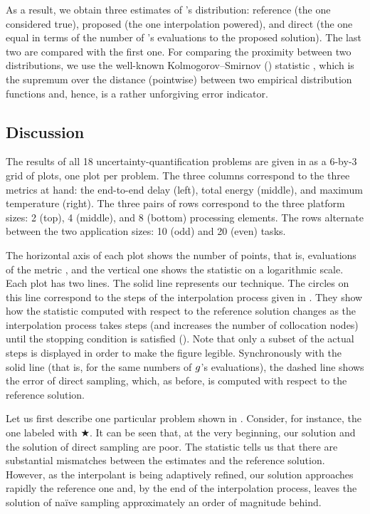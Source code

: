 As a result, we obtain three estimates of \g's distribution: reference (the one
considered true), proposed (the one interpolation powered), and direct (the one
equal in terms of the number of \g's evaluations to the proposed solution). The
last two are compared with the first one. For comparing the proximity between
two distributions, we use the well-known Kolmogorov--Smirnov () statistic
\cite{rao2002}, which is the supremum over the distance (pointwise) between two
empirical distribution functions and, hence, is a rather unforgiving error
indicator.

\subsection{Discussion}

The results of all 18 uncertainty-quantification problems are given in
 as a 6-by-3 grid of plots, one plot per problem. The three
columns correspond to the three metrics at hand: the end-to-end delay (left),
total energy (middle), and maximum temperature (right). The three pairs of rows
correspond to the three platform sizes: 2 (top), 4 (middle), and 8 (bottom)
processing elements. The rows alternate between the two application sizes: 10
(odd) and 20 (even) tasks.

The horizontal axis of each plot shows the number of points, that is,
evaluations of the metric \g, and the vertical one shows the  statistic
on a logarithmic scale. Each plot has two lines. The solid line represents our
technique. The circles on this line correspond to the steps of the interpolation
process given in . They show how the  statistic
computed with respect to the reference solution changes as the interpolation
process takes steps (and increases the number of collocation nodes) until the
stopping condition is satisfied (). Note that only a subset of
the actual steps is displayed in order to make the figure legible. Synchronously
with the solid line (that is, for the same numbers of $g$'s evaluations), the
dashed line shows the error of direct sampling, which, as before, is computed
with respect to the reference solution.

Let us first describe one particular problem shown in . Consider,
for instance, the one labeled with $\bigstar$. It can be seen that, at the very
beginning, our solution and the solution of direct sampling are poor. The
 statistic tells us that there are substantial mismatches between the
estimates and the reference solution. However, as the interpolant is being
adaptively refined, our solution approaches rapidly the reference one and, by
the end of the interpolation process, leaves the solution of na\"{i}ve sampling
approximately an order of magnitude behind.

